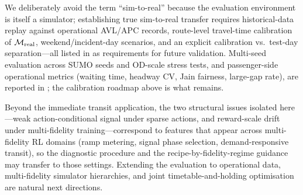 We deliberately avoid the term ``sim-to-real'' because the evaluation environment is itself a simulator; establishing true sim-to-real transfer requires historical-data replay against operational AVL/APC records, route-level travel-time calibration of $\mathcal{M}_{\mathrm{real}}$, weekend/incident-day scenarios, and an explicit calibration vs.\ test-day separation---all listed in  as requirements for future validation.
Multi-seed evaluation across SUMO seeds and OD-scale stress tests, and passenger-side operational metrics (waiting time, headway CV, Jain fairness, large-gap rate), are reported in ; the calibration roadmap above is what remains.

Beyond the immediate transit application, the two structural issues isolated here---weak action-conditional signal under sparse actions, and reward-scale drift under multi-fidelity training---correspond to features that appear across multi-fidelity RL domains (ramp metering, signal phase selection, demand-responsive transit), so the diagnostic procedure and the recipe-by-fidelity-regime guidance may transfer to those settings.
Extending the evaluation to operational data, multi-fidelity simulator hierarchies, and joint timetable-and-holding optimisation are natural next directions.
